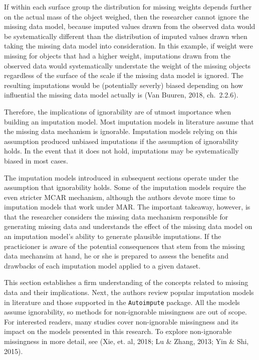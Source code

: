 \documentclass[12pt,oneside]{chicagocapstone}
\begin{document}
If within each surface group the distribution for missing weights
depends further on the actual mass of the object weighed, then the
researcher cannot ignore the missing data model, because imputed values
drawn from the observed data would be systematically different than the
distribution of imputed values drawn when taking the missing data model
into consideration. In this example, if weight were missing for objects
that had a higher weight, imputations drawn from the observed data would
systematically understate the weight of the missing objects regardless
of the surface of the scale if the missing data model is ignored. The
resulting imputations would be (potentially severly) biased depending on
how influential the missing data model actually is (Van Buuren, 2018,
ch.~2.2.6).

Therefore, the implications of ignorability are of utmost importance
when building an imputation model. Most imputation models in literature
assume that the missing data mechanism is ignorable. Imputation models
relying on this assumption produced unbiased imputations if the
assumption of ignorability holds. In the event that it does not hold,
imputations may be systematically biased in most cases.

The imputation models introduced in subsequent sections operate under
the assumption that ignorability holds. Some of the imputation models
require the even stricter MCAR mechanism, although the authors devote
more time to imputation models that work under MAR. The important
takeaway, however, is that the researcher considers the missing data
mechanism responsible for generating missing data and understands the
effect of the missing data model on an imputation model's ability to
generate plausible imputations. If the practicioner is aware of the
potential consequences that stem from the missing data mechansim at
hand, he or she is prepared to assess the benefits and drawbacks of each
imputation model applied to a given dataset.

This section establishes a firm understanding of the concepts related to
missing data and their implications. Next, the authors review popular
imputation models in literature and those supported in the
\texttt{Autoimpute} package. All the models assume ignorability, so
methods for non-ignorable missingness are out of scope. For interested
readers, many studies cover non-ignorable missingness and its impact on
the models presented in this research. To explore non-ignorable
missingness in more detail, see (Xie, et. al, 2018; Lu \& Zhang, 2013;
Yin \& Shi, 2015).
\end{document}
